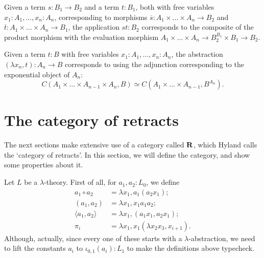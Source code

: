 Given a term $ s: B_1 \to B_2 $ and a term $ t: B_1 $, both with free variables $ x_1: A_1, \dots, x_n: A_n $, corresponding to morphisms $ \overline s: A_1 \times \dots \times A_n \to B_2 $ and $ \overline t: A_1 \times \dots \times A_n \to B_1 $, the application $ st: B_2 $ corresponds to the composite of the product morphism with the evaluation morphism $ A_1 \times \dots \times A_n \to B_2^{B_1} \times B_1 \to B_2 $.
\begin{center}
\end{center}

Given a term $ t: B $ with free variables $ x_1: A_1, \dots, x_n: A_n $, the abstraction $ (\lambda x_n, t): A_n \to B $ corresponds to using the adjunction corresponding to the exponential object of $ A_n $:
\[ C(A_1 \times \dots \times A_{n-1} \times A_n, B) \simeq C(A_1 \times \dots \times A_{n-1}, B^{A_n}). \]

\section{The category of retracts}

The next sections make extensive use of a category called $ \mathbf{R} $, which Hyland calls the `category of retracts'. In this section, we will define the category, and show some properties about it.

Let $ L $ be a $ \lambda $-theory. First of all, for $ a_1, a_2: L_0 $, we define
\begin{align*}
  a_1 \circ a_2 &= \lambda x_1, a_1 (a_2 x_1);\\
  (a_1, a_2) &= \lambda x_1, x_1 a_1 a_2;\\
  \langle a_1, a_2 \rangle &= \lambda x_1, (a_1 x_1, a_2 x_1);\\
  \pi_i &= \lambda x_1, x_1 (\lambda x_2 x_3, x_{i + 1}).
\end{align*}
Although, actually, since every one of these starts with a $ \lambda $-abstraction, we need to lift the constants $ a_i $ to $ \iota_{0, 1}(a_i): L_1 $ to make the definitions above typecheck.

